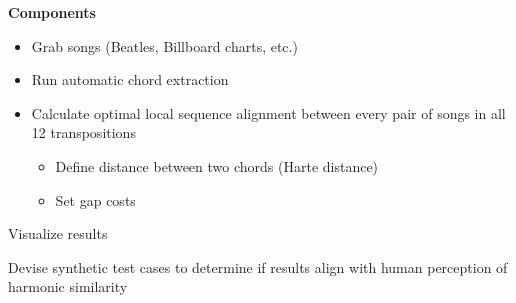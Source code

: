 \textbf{Components}

\begin{itemize}
\item Grab songs (Beatles, Billboard charts, etc.)
\item Run automatic chord extraction
\item Calculate optimal local sequence alignment between every pair of songs in all 12 transpositions
    \begin{itemize}
    \item Define distance between two chords (Harte distance)
    \item Set gap costs
    \end{itemize}
\end{itemize}
\item Visualize results
\item Devise synthetic test cases to determine if results align with human perception of harmonic similarity